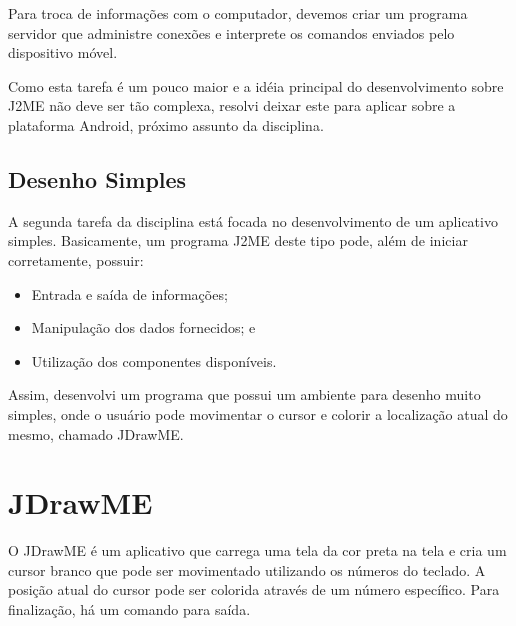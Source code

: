 \documentclass{article}
\begin{document}
Para troca de informações com o computador, devemos criar um programa servidor
que administre conexões e interprete os comandos enviados pelo dispositivo
móvel.

Como esta tarefa é um pouco maior e a idéia principal do desenvolvimento sobre
J2ME não deve ser tão complexa, resolvi deixar este para aplicar sobre a
plataforma Android, próximo assunto da disciplina.

\subsection{Desenho Simples}

A segunda tarefa da disciplina está focada no desenvolvimento de um aplicativo
simples. Basicamente, um programa J2ME deste tipo pode, além de iniciar
corretamente, possuir:

\begin{itemize}
  \item Entrada e saída de informações;
  \item Manipulação dos dados fornecidos; e
  \item Utilização dos componentes disponíveis.
\end{itemize}

Assim, desenvolvi um programa que possui um ambiente para desenho muito simples,
onde o usuário pode movimentar o cursor e colorir a localização atual do mesmo,
chamado JDrawME.

\section{JDrawME}
\label{sec:jdrawme}

O JDrawME é um aplicativo que carrega uma tela da cor preta na tela e cria um
cursor branco que pode ser movimentado utilizando os números do teclado. A
posição atual do cursor pode ser colorida através de um número específico. Para
finalização, há um comando para saída.
\end{document}
